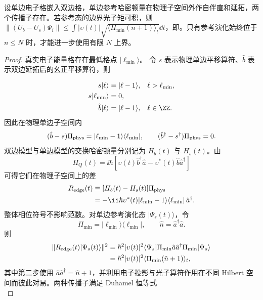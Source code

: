 \begin{proposition}[物理格边界的量子传播误差]
设单边电子格嵌入双边格，单边参考哈密顿量在物理子空间外作自伴直和延拓，两个传播子存在。若参考态的边界光子矩可积，则 $\|(U_b-U_s)\Psi_i\|\le\int|\upsilon(t)|\sqrt{\langle\Pi_{\min}(n+1)\rangle_t}\dd t$，即。只有参考演化始终位于 $n\le N$ 时，才能进一步使用有限 $N$ 上界。
\end{proposition}
\begin{proof}
真实电子能量格存在最低格点 $|\ell_{\min}\rangle$。 令 $s$ 表示物理单边平移算符、$\hat b$ 表示双边延拓后的幺正平移算符，则

\begin{align*}
s|\ell\rangle&=|\ell-1\rangle,
&&\ell>\ell_{\min},\\
s|\ell_{\min}\rangle&=0,\\
\hat b|\ell\rangle&=|\ell-1\rangle,
&&\ell\in\ZZ.
\end{align*}
因此在物理单边子空间内
\begin{equation*}
(\hat b-s)\Pi_{\rm phys}
=|\ell_{\min}-1\rangle\langle\ell_{\min}|,
\qquad
(\hat b^\dagger-s^\dagger)\Pi_{\rm phys}=0.
\end{equation*}
双边模型与单边模型的交换哈密顿量分别记为 $H_b(t)$ 与 $H_s(t)$。由
\begin{equation*}
H_Q(t)=\ii\hbar[\upsilon(t)\hat b^\dagger\hat a-\upsilon^*(t)\hat b\hat a^\dagger]
\end{equation*}
可得它们在物理子空间上的差
\begin{align*}
R_{\rm edge}(t)
&\equiv[H_b(t)-H_s(t)]\Pi_{\rm phys}\\
&=-\ii\hbar\upsilon^*(t)
|\ell_{\min}-1\rangle\langle\ell_{\min}|\,\hat a^\dagger .
\end{align*}
整体相位符号不影响范数。对单边参考演化态 $|\Psi_s(t)\rangle$，令
\begin{equation*}
\Pi_{\min}=|\ell_{\min}\rangle\langle\ell_{\min}|,
\qquad
\hat n=\hat a^\dagger\hat a.
\end{equation*}
则
\begin{align*}
\|R_{\rm edge}(t)|\Psi_s(t)\rangle\|^2
&=\hbar^2|\upsilon(t)|^2
\langle\Psi_s|
\Pi_{\min}\hat a\hat a^\dagger\Pi_{\min}
|\Psi_s\rangle\\
&=\hbar^2|\upsilon(t)|^2
\langle\Pi_{\min}(\hat n+1)\rangle_t,
\end{align*}
其中第二步使用 $\hat a\hat a^\dagger=\hat n+1$，并利用电子投影与光子算符作用在不同 Hilbert 空间而彼此对易。两种传播子满足 Duhamel 恒等式
\begin{equation*}

\end{equation*}
\end{proof}
